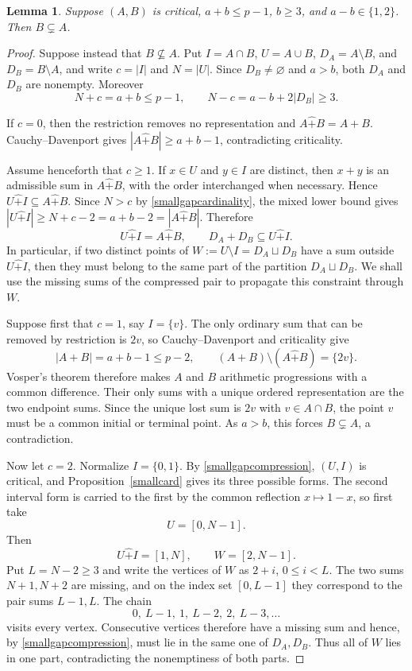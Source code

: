 \documentclass[10pt,a4paper]{amsart}
\newtheorem{lemma}{Lemma}[section]
\newcommand{\rs}{\mathbin{\widehat+}}
\begin{document}
\begin{lemma}\label{containment}
Suppose $(A,B)$ is critical, $a+b\le p-1$, $b\ge3$, and
$a-b\in\{1,2\}$.  Then $B\subsetneq A$.
\end{lemma}
\begin{proof}
Suppose instead that $B\nsubseteq A$.  Put
$ I=A\cap B$, $U=A\cup B$, $D_A=A\setminus B$, and
$D_B=B\setminus A$, and write $c=|I|$ and $N=|U|$.
Since $D_B\ne\varnothing$ and $a>b$, both $D_A$ and $D_B$ are nonempty.
Moreover
\begin{equation}\label{smallgapcardinality}
 N+c=a+b\le p-1,
 \qquad
 N-c=a-b+2|D_B|\ge3.
\end{equation}

If $c=0$, then the restriction removes no representation and
$A\rs B=A+B$.  Cauchy--Davenport gives
$|A\rs B|\ge a+b-1$, contradicting criticality.

Assume henceforth that $c\ge1$.  If $x\in U$ and $y\in I$ are distinct,
then $x+y$ is an admissible sum in $A\rs B$, with the order interchanged
when necessary.  Hence $U\rs I\subseteq A\rs B$.  Since $N>c$ by
\eqref{smallgapcardinality}, the mixed lower bound gives
$|U\rs I|\ge N+c-2=a+b-2=|A\rs B|$.  Therefore
\begin{equation}\label{smallgapcompression}
 U\rs I=A\rs B,
 \qquad
 D_A+D_B\subseteq U\rs I.
\end{equation}
In particular, if two distinct points of
$W:=U\setminus I=D_A\sqcup D_B$ have a sum outside $U\rs I$, then they must belong to the same part of
the partition $D_A\sqcup D_B$.  We shall use the missing sums of the
compressed pair to propagate this constraint through $W$.

Suppose first that $c=1$, say $I=\{v\}$.  The only ordinary sum that can
be removed by restriction is $2v$, so Cauchy--Davenport and criticality
give
\[
 |A+B|=a+b-1\le p-2,
 \qquad
 (A+B)\setminus(A\rs B)=\{2v\}.
\]
Vosper's theorem \cite{Vosper1,Vosper2} therefore makes $A$ and $B$
arithmetic progressions with a common difference.  Their only sums with
a unique ordered representation are the two endpoint sums.  Since the
unique lost sum is $2v$ with $v\in A\cap B$, the point $v$ must be a common initial or terminal point.  As $a>b$, this
forces $B\subsetneq A$, a contradiction.

Now let $c=2$.  Normalize $I=\{0,1\}$.  By
\eqref{smallgapcompression}, $(U,I)$ is critical, and
Proposition~\ref{smallcard} gives its three possible forms.  The second
interval form is carried to the first by the common reflection
$x\mapsto1-x$, so first take
\[
 U=[0,N-1].
\]
Then
\[
 U\rs I=[1,N],\qquad W=[2,N-1].
\]
Put $L=N-2\ge3$ and write the vertices of $W$ as $2+i$,
$0\le i<L$.  The two sums $N+1,N+2$ are missing, and on the index set
$[0,L-1]$ they correspond to the pair sums $L-1,L$.  The chain
\[
 0,\ L-1,\ 1,\ L-2,\ 2,\ L-3,\ldots
\]
visits every vertex.  Consecutive vertices therefore have a missing sum
and hence, by \eqref{smallgapcompression}, must lie in the same one of
$D_A,D_B$.  Thus all of $W$ lies in one part, contradicting the
nonemptiness of both parts.


\end{proof}
\end{document}

